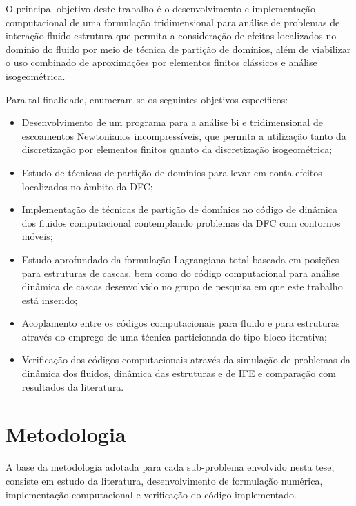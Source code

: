 O principal objetivo deste trabalho é o desenvolvimento e implementação computacional de uma formulação tridimensional para análise de problemas de interação fluido-estrutura que permita a consideração de efeitos localizados no domínio do fluido por meio de técnica de partição de domínios, além de viabilizar o uso combinado de aproximações por elementos finitos clássicos e análise isogeométrica.

Para tal finalidade, enumeram-se os seguintes objetivos específicos:

\begin{itemize}
	\item Desenvolvimento de um programa para a análise bi e tridimensional de escoamentos Newtonianos incompressíveis, que permita a utilização tanto da discretização por elementos finitos quanto da discretização isogeométrica;
	
	\item Estudo de técnicas de partição de domínios para levar em conta efeitos localizados no âmbito da DFC;
	
	\item Implementação de técnicas de partição de domínios no código de dinâmica dos fluidos computacional contemplando problemas da DFC com contornos móveis;
	
	\item Estudo aprofundado da formulação Lagrangiana total baseada em posições para estruturas de cascas, bem como do código computacional para análise dinâmica de cascas desenvolvido no grupo de pesquisa em que este trabalho está inserido;
	
	\item Acoplamento entre os códigos computacionais para fluido e para estruturas através do emprego de uma técnica particionada do tipo bloco-iterativa;
	
	\item  Verificação dos códigos computacionais através da simulação de problemas da dinâmica dos fluidos, dinâmica das estruturas e de IFE e comparação com resultados da literatura.
	
\end{itemize}

\section[Metodologia]{Metodologia} 
A base da metodologia adotada para cada sub-problema envolvido nesta tese, consiste em estudo da literatura, desenvolvimento de formulação numérica, implementação computacional e verificação do código implementado.

